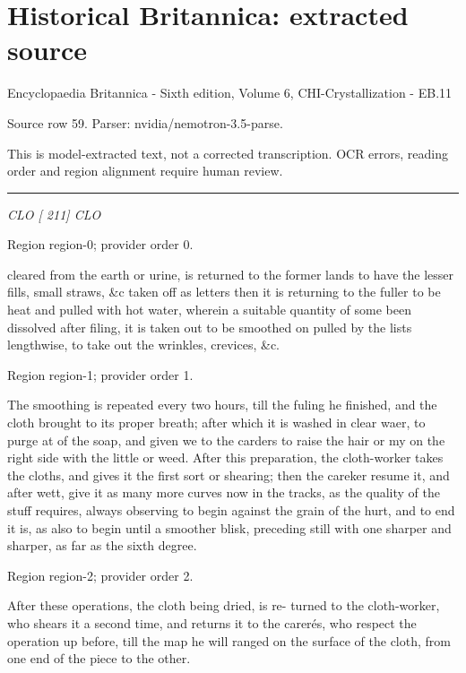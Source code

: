 \documentclass[11pt]{article}
\begin{document}
\section*{Historical Britannica: extracted source}
Encyclopaedia Britannica - Sixth edition, Volume 6, CHI-Crystallization - EB.11\par
{\small Source row 59. Parser: nvidia/nemotron-3.5-parse.\par}
{\small This is model-extracted text, not a corrected transcription. OCR errors, reading order and region alignment require human review.\par}
\hrule\medskip
{\small\itshape CLO [ 211] CLO\par}

{\scriptsize\color{gray} Region region-0; provider order 0.\par}
\medskip

cleared from the earth or urine, is returned to the former lands to have the lesser fills, small straws, \&c taken off as letters then it is returning to the fuller to be heat and pulled with hot water, wherein a suitable quantity of some been dissolved after filing, it is taken out to be smoothed on pulled by the lists lengthwise, to take out the wrinkles, crevices, \&c.
\par

{\scriptsize\color{gray} Region region-1; provider order 1.\par}
\medskip

The smoothing is repeated every two hours, till the fuling he finished, and the cloth brought to its proper breath; after which it is washed in clear waer, to purge at of the soap, and given we to the carders to raise the hair or my on the right side with the little or weed. After this preparation, the cloth-worker takes the cloths, and gives it the first sort or shearing; then the careker resume it, and after wett, give it as many more curves now in the tracks, as the quality of the stuff requires, always observing to begin against the grain of the hurt, and to end it is, as also to begin until a smoother blisk, preceding still with one sharper and sharper, as far as the sixth degree.
\par

{\scriptsize\color{gray} Region region-2; provider order 2.\par}
\medskip

After these operations, the cloth being dried, is re- turned to the cloth-worker, who shears it a second time, and returns it to the carerés, who respect the operation up before, till the map he will ranged on the surface of the cloth, from one end of the piece to the other.
\par
\end{document}
